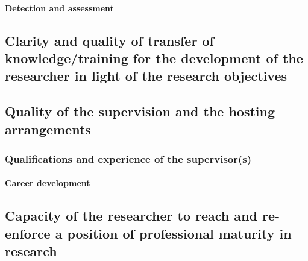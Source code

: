 \paragraph{Detection and assessment}

\subsection{Clarity and quality of transfer of knowledge/training for the development of the researcher in light of the research objectives}
\label{sec:transfer}


\subsection{Quality of the supervision and the hosting arrangements}
\label{sec:supervision}

\subsubsection*{Qualifications and experience of the supervisor(s)}


\paragraph{Career development}

\subsection{Capacity of the researcher to reach and re-enforce a position of professional maturity in research}
\label{sec:maturity}
